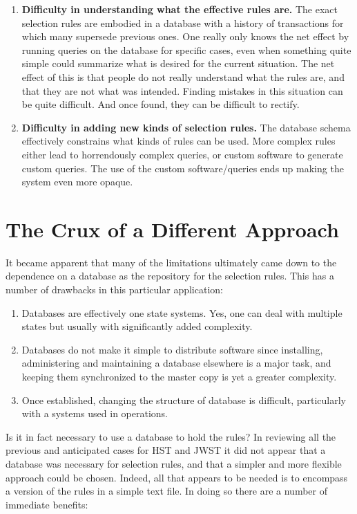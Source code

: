 \documentclass[final,authoryear,5p,times,twocolumn]{elsarticle}
\begin{document}
\begin{enumerate}
\item \textbf{Difficulty in understanding what the effective rules are.}
The exact
selection rules are embodied in a database with a history of transactions for
which many supersede previous ones. One really only knows the net effect by
running queries on the database for specific cases, even when something quite
simple could summarize what is desired for the current situation. The net
effect of this is that people do not really understand what the rules are, and
that they are not what was intended. Finding mistakes in this situation can be
quite difficult. And once found, they can be difficult to rectify.

\item \textbf{Difficulty in adding new kinds of selection rules.} 
The database schema
effectively constrains what kinds of rules can be used. More complex rules
either lead to horrendously complex queries, or custom software to generate
custom queries. The use of the custom software/queries ends up making the system
even more opaque.
\end{enumerate}

\section{The Crux of a Different Approach}

It became apparent that many of the limitations ultimately came down to the
dependence on a database as the repository for the selection rules. This has a
number of drawbacks in this particular application:

\begin{enumerate}
\item Databases are effectively one state systems. Yes, one can deal with
multiple states but usually with significantly added complexity.
\item Databases do not make it simple to distribute software since installing,
administering and maintaining a database elsewhere is a major task, and keeping
them synchronized to the master copy is yet a greater complexity.
\item Once established, changing the structure of database is difficult,
particularly with a systems used in operations.
\end{enumerate}

Is it in fact necessary to use a database to hold the rules? In reviewing all
the previous and anticipated cases for HST and JWST it did not appear that a
database was necessary for selection rules, and that a simpler and more
flexible approach could be chosen. Indeed, all that appears to be needed is to
encompass a version of the rules in a simple text file. In doing so there are a
number of immediate benefits:
\end{document}
